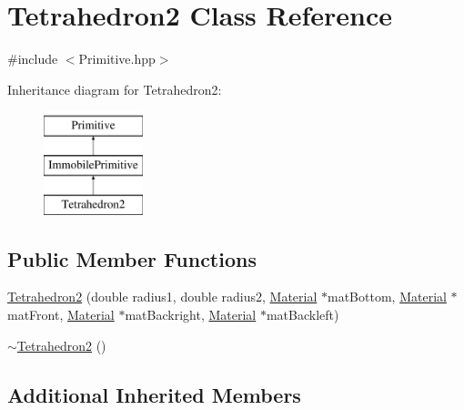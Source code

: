 \hypertarget{class_tetrahedron2}{\section{Tetrahedron2 Class Reference}
\label{class_tetrahedron2}
}


{\ttfamily \#include $<$Primitive.\-hpp$>$}

Inheritance diagram for Tetrahedron2\-:\begin{figure}[H]
\begin{center}
\leavevmode
\includegraphics[height=3.000000cm]{class_tetrahedron2}
\end{center}
\end{figure}
\subsection*{Public Member Functions}
\begin{DoxyCompactItemize}
\item 
\hyperlink{class_tetrahedron2_a765d55000c92cfe28af7e7a04cf2d4cc}{Tetrahedron2} (double radius1, double radius2, \hyperlink{class_material}{Material} $\ast$mat\-Bottom, \hyperlink{class_material}{Material} $\ast$mat\-Front, \hyperlink{class_material}{Material} $\ast$mat\-Backright, \hyperlink{class_material}{Material} $\ast$mat\-Backleft)
\item 
\hyperlink{class_tetrahedron2_a668ee8aec30331661ab295df9e8b1365}{$\sim$\-Tetrahedron2} ()
\end{DoxyCompactItemize}
\subsection*{Additional Inherited Members}


